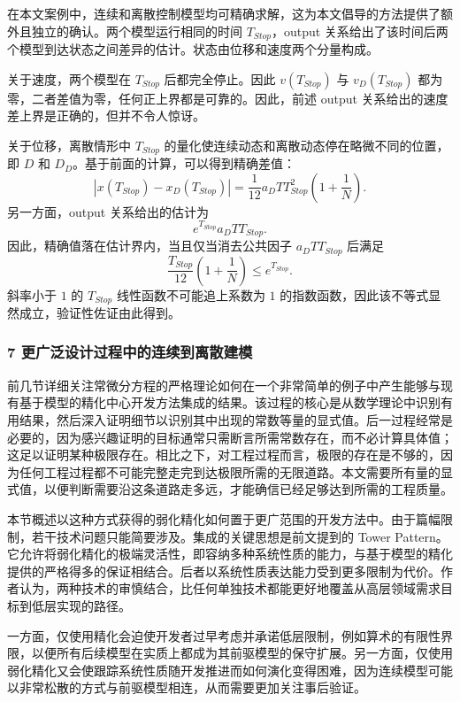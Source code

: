 {\indent 在本文案例中，连续和离散控制模型均可精确求解，这为本文倡导的方法提供了额外且独立的确认。两个模型运行相同的时间 $T_{Stop}$，output 关系给出了该时间后两个模型到达状态之间差异的估计。状态由位移和速度两个分量构成。

\indent 关于速度，两个模型在 $T_{Stop}$ 后都完全停止。因此 $v(T_{Stop})$ 与 $v_D(T_{Stop})$ 都为零，二者差值为零，任何正上界都是可靠的。因此，前述 output 关系给出的速度差上界是正确的，但并不令人惊讶。

\indent 关于位移，离散情形中 $T_{Stop}$ 的量化使连续动态和离散动态停在略微不同的位置，即 $D$ 和 $D_D$。基于前面的计算，可以得到精确差值：
\[
|x(T_{Stop})-x_D(T_{Stop})|
=\frac{1}{12}a_DT T_{Stop}^{2}\left(1+\frac{1}{N}\right).
\]
另一方面，output 关系给出的估计为
\[
e^{T_{Stop}}a_DTT_{Stop}.
\]
因此，精确值落在估计界内，当且仅当消去公共因子 $a_DTT_{Stop}$ 后满足
\[
\frac{T_{Stop}}{12}\left(1+\frac{1}{N}\right)\leq e^{T_{Stop}} .
\]
斜率小于 $1$ 的 $T_{Stop}$ 线性函数不可能追上系数为 $1$ 的指数函数，因此该不等式显然成立，验证性佐证由此得到。

\subsubsection*{7 更广泛设计过程中的连续到离散建模}

\indent 前几节详细关注常微分方程的严格理论如何在一个非常简单的例子中产生能够与现有基于模型的精化中心开发方法集成的结果。该过程的核心是从数学理论中识别有用结果，然后深入证明细节以识别其中出现的常数等量的显式值。后一过程经常是必要的，因为感兴趣证明的目标通常只需断言所需常数存在，而不必计算具体值；这足以证明某种极限存在。相比之下，对工程过程而言，极限的存在是不够的，因为任何工程过程都不可能完整走完到达极限所需的无限道路。本文需要所有量的显式值，以便判断需要沿这条道路走多远，才能确信已经足够达到所需的工程质量。

\indent 本节概述以这种方式获得的弱化精化如何置于更广范围的开发方法中。由于篇幅限制，若干技术问题只能简要涉及。集成的关键思想是前文提到的 Tower Pattern。它允许将弱化精化的极端灵活性，即容纳多种系统性质的能力，与基于模型的精化提供的严格得多的保证相结合。后者以系统性质表达能力受到更多限制为代价。作者认为，两种技术的审慎结合，比任何单独技术都能更好地覆盖从高层领域需求目标到低层实现的路径。

\indent 一方面，仅使用精化会迫使开发者过早考虑并承诺低层限制，例如算术的有限性界限，以便所有后续模型在实质上都成为其前驱模型的保守扩展。另一方面，仅使用弱化精化又会使跟踪系统性质随开发推进而如何演化变得困难，因为连续模型可能以非常松散的方式与前驱模型相连，从而需要更加关注事后验证。

}
